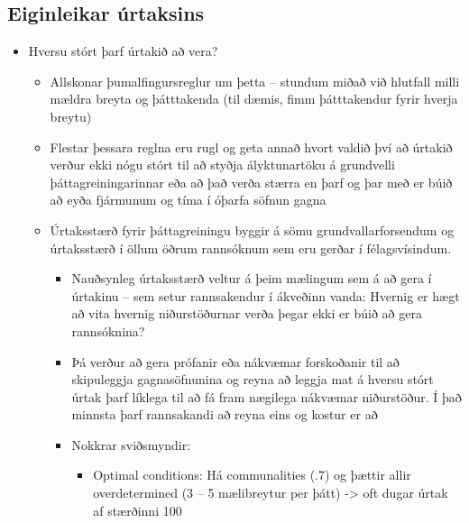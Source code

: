 \documentclass[]{book}
\providecommand{\tightlist}{%
  \setlength{\itemsep}{0pt}\setlength{\parskip}{0pt}}
\begin{document}
\hypertarget{eiginleikar-uxfartaksins}{%
\subsection{Eiginleikar úrtaksins}\label{eiginleikar-uxfartaksins}}

\begin{itemize}
\tightlist
\item
  Hversu stórt þarf úrtakið að vera?

  \begin{itemize}
  \tightlist
  \item
    Allskonar þumalfingursreglur um þetta -- stundum miðað við hlutfall milli mældra breyta og þátttakenda (til dæmis, fimm þátttakendur fyrir hverja breytu)
  \item
    Flestar þessara reglna eru rugl og geta annað hvort valdið því að úrtakið verður ekki nógu stórt til að styðja ályktunartöku á grundvelli þáttagreiningarinnar eða að það verða stærra en þarf og þar með er búið að eyða fjármunum og tíma í óþarfa söfnun gagna
  \item
    Úrtaksstærð fyrir þáttagreiningu byggir á sömu grundvallarforsendum og úrtaksstærð í öllum öðrum rannsóknum sem eru gerðar í félagsvísindum.

    \begin{itemize}
    \tightlist
    \item
      Nauðsynleg úrtaksstærð veltur á þeim mælingum sem á að gera í úrtakinu -- sem setur rannsakendur í ákveðinn vanda: Hvernig er hægt að vita hvernig niðurstöðurnar verða þegar ekki er búið að gera rannsóknina?
    \item
      Þá verður að gera prófanir eða nákvæmar forskoðanir til að skipuleggja gagnasöfnunina og
      reyna að leggja mat á hversu stórt úrtak þarf líklega til að fá fram nægilega nákvæmar
      niðurstöður. Í það minnsta þarf rannsakandi að reyna eins og kostur er að
    \item
      Nokkrar sviðsmyndir:

      \begin{itemize}
      \tightlist
      \item
        Optimal conditions: Há communalities (.7) og þættir allir overdetermined (3 -- 5
        mælibreytur per þátt) -\textgreater{} oft dugar úrtak af stærðinni 100


\end{itemize}
\end{itemize}
\end{itemize}
\end{itemize}
\end{document}
